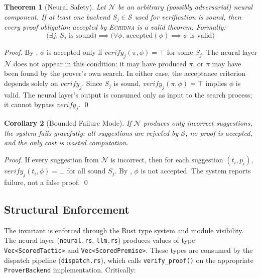 \documentclass[11pt,a4paper]{article}
\newtheorem{theorem}{Theorem}[section]
\newtheorem{corollary}[theorem]{Corollary}
\newcommand{\echidna}{\textsc{Echidna}}
\newcommand{\proverbackend}{\texttt{ProverBackend}}
\newcommand{\neural}{\ensuremath{\mathcal{N}}}
\newcommand{\symbolic}{\ensuremath{\mathcal{S}}}
\begin{document}
\begin{theorem}[Neural Safety]
\label{thm:safety}
Let $\neural$ be an arbitrary (possibly adversarial) neural component.
If at least one backend $S_j \in \symbolic$ used for verification is sound,
then every proof obligation accepted by \echidna{} is a valid theorem.
Formally:
\[
  \bigl(\exists j.\; S_j \text{ is sound}\bigr) \implies
  \bigl(\forall \phi.\; \text{accepted}(\phi) \implies \phi \text{ is valid}\bigr)
\]
\end{theorem}

\begin{proof}
By , $\phi$ is accepted only if $\mathit{verify}_j(\pi, \phi) = \top$
for some $S_j$. The neural layer $\neural$ does not appear in this condition:
it may have produced $\pi$, or $\pi$ may have been found by the prover's own
search. In either case, the acceptance criterion depends solely on
$\mathit{verify}_j$. Since $S_j$ is sound, $\mathit{verify}_j(\pi, \phi) = \top$
implies $\phi$ is valid. The neural layer's output is consumed only as input
to the search process; it cannot bypass $\mathit{verify}_j$. \qed
\end{proof}

\begin{corollary}[Bounded Failure Mode]
\label{cor:bounded}
If $\neural$ produces only incorrect suggestions, the system fails gracefully:
all suggestions are rejected by $\symbolic$, no proof is accepted, and the only
cost is wasted computation.
\end{corollary}

\begin{proof}
If every suggestion from $\neural$ is incorrect, then for each suggestion
$(t_i, p_i)$, $\mathit{verify}_j(t_i, \phi) = \bot$ for all sound $S_j$.
By , $\phi$ is not accepted. The system reports failure,
not a false proof. \qed
\end{proof}

\subsection{Structural Enforcement}

The invariant is enforced through the Rust type system and module visibility.
The neural layer (\texttt{neural.rs}, \texttt{llm.rs}) produces values of type
\texttt{Vec<ScoredTactic>} and \texttt{Vec<ScoredPremise>}. These types are
consumed by the dispatch pipeline (\texttt{dispatch.rs}), which calls
\texttt{verify\_proof()} on the appropriate \proverbackend{} implementation.
Critically:
\end{document}
